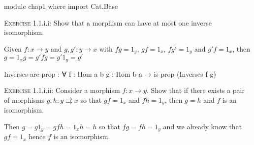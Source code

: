 \documentclass[12pt]{article}
\begin{document}
\begin{code}
module chap1 where
import Cat.Base
\end{code}

\textsc{Exercise} 1.1.i.i: Show that a morphism can have at most one inverse isomorphism.
\vspace{10pt}

Given \(f:x→y\) and \(g,g':y→x\) with \(fg=1_y\), \(gf= 1_x\), \(fg' = 1_y\) and \(g'f=1_x\), then \(g=1_xg=g'fg=g'1_y=g'\)

\begin{code}
Inverses-are-prop : ∀ {f : Hom a b} {g : Hom b a} → is-prop (Inverses f g)
\end{code}

\textsc{Exercise} 1.1.i.ii: Consider a morphism \(f: x → y\). Show  that if there exists a pair of morphisms \(g,h:y\rightrightarrows x\) so that \(gf=1_x\) and \(fh=1_y\), then \(g = h\) and \(f\) is an isomorphism.
\vspace{10pt}

Then \(g = g1_y = gfh = 1_xh = h\) so that \(fg = fh = 1_y\) and we already know that \(gf = 1_x\) hence \(f\) is an isomorphism.
\end{document}
